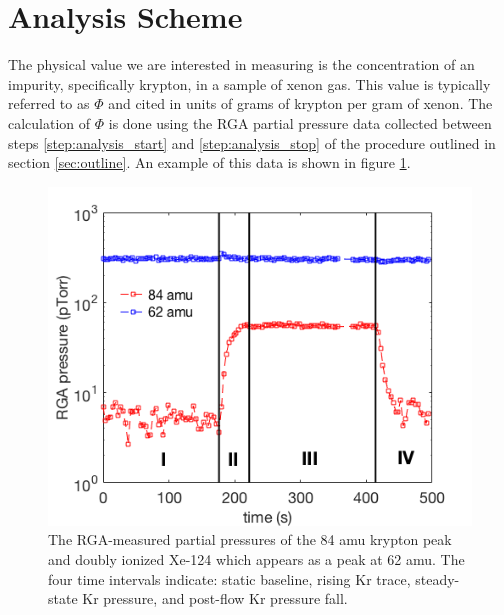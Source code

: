 \documentclass[12pt]{article}
\begin{document}
\section{Analysis Scheme}
The physical value we are interested in measuring is the concentration of an impurity, specifically krypton, in a sample of xenon gas. This value is typically referred to as $\Phi$ and cited in units of grams of krypton per gram of xenon. The calculation of $\Phi$ is done using the RGA partial pressure data collected between steps \ref{step:analysis_start} and \ref{step:analysis_stop} of the procedure outlined in section \ref{sec:outline}. An example of this data is shown in figure \ref{fig:RGAtrace}. 

\begin{figure}[h!]
  \includegraphics[width=\linewidth]{Figures/RGA_trace.png}
  \caption{The RGA-measured partial pressures of the 84 amu krypton peak and doubly ionized Xe-124 which appears as a peak at 62 amu. The four time intervals indicate: static baseline, rising Kr trace, steady-state Kr pressure, and post-flow Kr pressure fall.}
  \label{fig:RGAtrace}
\end{figure}
\end{document}
